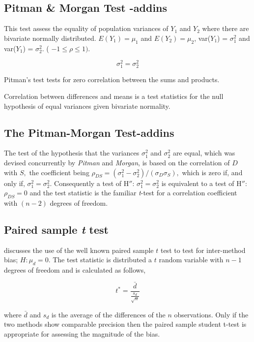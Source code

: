 \documentclass[12pt, a4paper]{report}
\theoremstyle{plain}
\theoremstyle{definition}
\theoremstyle{remark}
\begin{document}
\subsection{Pitman \& Morgan Test -addins} 

This test assess the equality of population variances of $Y_1$ and $Y_2$ where there are bivariate normally distributed. 
$E(Y_1) = \mu_1$ and $E(Y_2) = \mu_2$, var($Y_1$) =  $\sigma^2_1$ and var($Y_1$) = $\sigma^2_2$. ( $-1 \leq \rho \leq 1)$.

\[ \sigma^2_1 = \sigma^2_2 \]

Pitman's test tests for zero correlation between the sums and products.

Correlation between differences and means is a test statistics for the null hypothesis of equal variances given bivariate normality.

\subsection{The Pitman-Morgan Test-addins}

The test of the hypothesis that the variances $\sigma^2_1$ and $\sigma^2_2$ are equal, which was devised concurrently by \textit{Pitman} and \textit{Morgan}, 
is based on the correlation of $D$ with $S,$ the coefficient being $ \rho_{DS} = (\sigma^2_1 -\sigma^2_2) / ( \sigma_D \sigma_S ),$ which is zero if, and only
if, $\sigma^2_1 = \sigma^2_2.$ Consequently a test of H$''$: $\sigma^2_1 = \sigma^2_2$ is equivalent to a test of H$''$: $\rho_{DS}=0$ and the test statistic is the familiar {\it t}-test for a correlation coefficient with $(n-2)$ degrees of freedom.


\subsection{Paired sample \emph{t} test}

\citet{Bartko} discusses the use of the well known paired sample
$t$ test to test for inter-method bias; $H: \mu_{d}=0$. The test
statistic is distributed a $t$ random variable with $n-1$ degrees
of freedom and is calculated as follows,

\begin{equation}
t^{*} = \frac{\bar{d}}{ \frac{s_{d}}{\sqrt{n}}}
\end{equation}

where $\bar{d}$ and $s_{d}$ is the average of the differences of
the $n$ observations. Only if the two methods show comparable
precision then the paired sample student t-test is appropriate for
assessing the magnitude of the bias.
\end{document}
